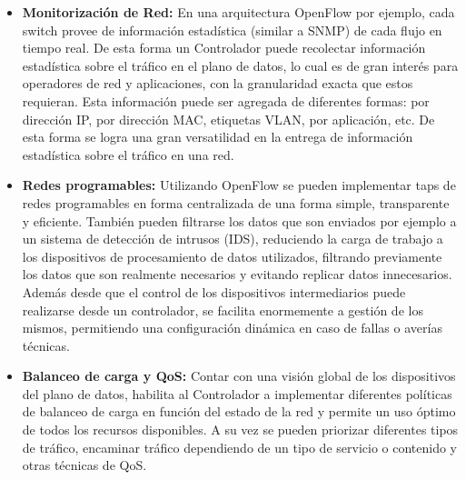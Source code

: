 \begin{itemize}

\item \textbf{Monitorizaci\'on de Red:}
En una arquitectura OpenFlow por ejemplo, cada switch provee de información estadística (similar a SNMP) de cada flujo en tiempo real. De esta forma un Controlador puede recolectar información estadística sobre el tráfico en el plano de datos, lo cual es de gran interés para operadores de red y aplicaciones, con la granularidad exacta que estos requieran. Esta información puede ser agregada de diferentes formas: por dirección IP, por dirección MAC, etiquetas VLAN, por aplicación, etc. De esta forma se logra una gran versatilidad en la entrega de información estadística sobre el tráfico en una red.

\item \textbf{Redes  programables:}
Utilizando OpenFlow se pueden implementar taps de redes programables en forma centralizada de una forma simple, transparente y eficiente. También pueden filtrarse los datos que son enviados por ejemplo a un sistema de detección de intrusos (IDS), reduciendo la carga de trabajo a los dispositivos de procesamiento de datos utilizados, filtrando previamente los datos que son realmente necesarios y evitando replicar datos innecesarios.\\
Además desde que el control de los dispositivos intermediarios puede realizarse desde un controlador, se facilita enormemente a gestión de los mismos, permitiendo una configuración dinámica en caso de fallas o averías técnicas.


\item \textbf{Balanceo de carga y QoS:}
Contar con una visión global de los dispositivos del plano de datos, habilita al Controlador a implementar diferentes políticas de balanceo de carga en función del estado de la red y permite un uso óptimo de todos los recursos disponibles. A su vez se pueden priorizar diferentes tipos de tráfico, encaminar tráfico dependiendo de un tipo de servicio o contenido y otras técnicas de QoS.


\end{itemize}
